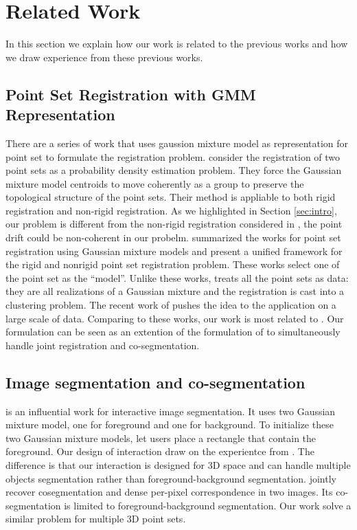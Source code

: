 \section{Related Work}
\label{sec:rw}
In this section we explain how our work is related to the previous works and how we draw experience from these previous works.
\subsection{Point Set Registration with GMM Representation}
\label{subsec:gmmreg}
There are a series of work that uses gaussion mixture model as representation for point set to formulate the registration problem.
\cite{CPD} consider the registration of two point sets as a probability density estimation problem. They force the Gaussian mixture model centroids to move coherently as a group to preserve the topological structure of the point sets. Their method is appliable to both rigid registration and non-rigid registration. As we highlighted in Section \ref{sec:intro}, our problem is different from the non-rigid registration considered in \cite{CPD}, the point drift could be non-coherent in our probelm.\cite{GMM_PAMI} summarized the works for point set registration using Gaussian mixture models and present a unified framework for the rigid and nonrigid point set registration problem. These works select one of the point set as the ``model''. Unlike these works, \cite{Evangelidis2014} treats all the point sets as data: they are all realizations of a Gaussian mixture and the registration is cast into a clustering problem. The recent work of \cite{GOGMA} pushes the idea to the application on a large scale of data. 
Comparing to these works, our work is most related to \cite{Evangelidis2014}. Our formulation can be seen as an extention of the formulation of \cite{Evangelidis2014} to simultaneously handle joint registration and co-segmentation.
\subsection{Image segmentation and co-segmentation}
\label{subsec:coseg}
\cite{grabcut} is an influential work for interactive image segmentation. It uses two Gaussian mixture model, one for foreground and one for background. To initialize these two Gaussian mixture models, \cite{grabcut} let users place a rectangle that contain the foreground. Our design of interaction draw on the experientce from \cite{grabcut}. The difference is that our interaction is designed for 3D space and can handle multiple objects segmentation rather than foreground-background segmentation. \cite{Taniai_2016_CVPR} jointly recover cosegmentation and dense per-pixel correspondence in two images. Its co-segmentation is limited to foreground-background segmentation. Our work solve a similar problem for multiple 3D point sets. 

